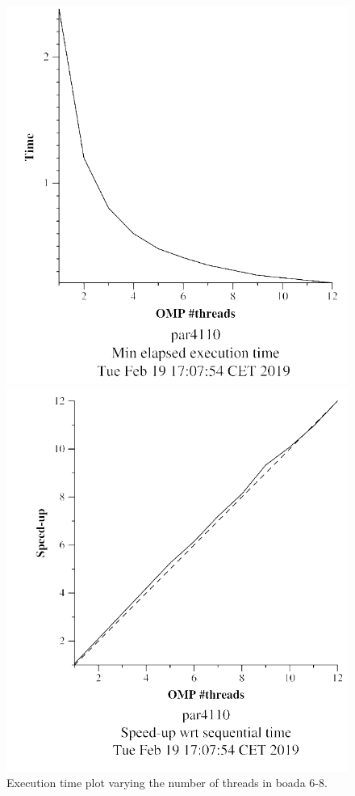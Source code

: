\documentclass[12pt, a4paper]{article}
\begin{document}
\begin{figure}[H]
\begin{minipage}[b]{0.45\linewidth}
\centering
\includegraphics[width=\textwidth]{./images/strong_v7_1}
\caption{Execution time plot varying the number of threads in boada 6-8.}
\label{fig:strong_v7_1}
\end{minipage}
\hspace{0.5cm}
\begin{minipage}[b]{0.45\linewidth}
\centering
\includegraphics[width=\textwidth]{./images/strong_v7_2}


\end{minipage}
\end{figure}
\end{document}
